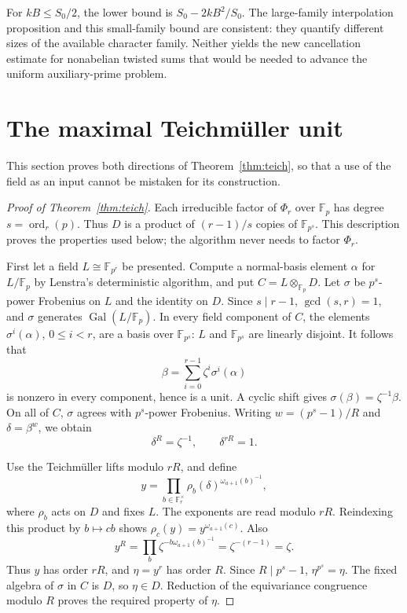 \documentclass[11pt]{article}
\newcommand{\F}{\mathbb F}
\newcommand{\ord}{\operatorname{ord}}
\newcommand{\Gal}{\operatorname{Gal}}
\theoremstyle{definition}
\theoremstyle{remark}
\begin{document}
For \(kB\leq S_0/2\), the lower bound is
\(S_0-2kB^2/S_0\). The large-family interpolation proposition
and this small-family bound are consistent: they quantify different
sizes of the available character family. Neither yields the new
cancellation estimate for nonabelian twisted sums that would be
needed to advance the uniform auxiliary-prime problem.


\section{The maximal Teichm\"uller unit}
This section proves both directions of Theorem~\ref{thm:teich},
so that a use of the field as an input cannot be mistaken for its construction.

\begin{proof}[Proof of Theorem~\ref{thm:teich}]
Each irreducible factor of $\Phi_r$ over $\F_p$ has degree
$s=\ord_r(p)$.  Thus $D$ is a product of $(r-1)/s$ copies
of $\F_{p^s}$.  This description proves the properties used
below; the algorithm never needs to factor $\Phi_r$.

First let a field $L\cong\F_{p^r}$ be presented.
Compute a normal-basis element $\alpha$ for $L/\F_p$ by
Lenstra's deterministic algorithm, and put $C=L\otimes_{\F_p}D$.
Let $\sigma$ be $p^s$-power Frobenius on $L$ and the identity
on $D$.  Since $s\mid r-1$, $\gcd(s,r)=1$, and $\sigma$
generates $\Gal(L/\F_p)$.  In every field component of $C$,
the elements $\sigma^i(\alpha)$, $0\le i<r$, are a basis over
$\F_{p^s}$: $L$ and $\F_{p^s}$ are linearly disjoint.
It follows that
\[
 \beta=\sum_{i=0}^{r-1}\zeta^i\sigma^i(\alpha)
\]
is nonzero in every component, hence is a unit.  A cyclic
shift gives $\sigma(\beta)=\zeta^{-1}\beta$.
On all of $C$, $\sigma$ agrees with $p^s$-power Frobenius.
Writing $w=(p^s-1)/R$ and $\delta=\beta^w$, we obtain
\[
 \delta^R=\zeta^{-1},\qquad \delta^{rR}=1.
\]

Use the Teichm\"uller lifts modulo $rR$, and define
\[
 y=\prod_{b\in\F_r^\times}
          \rho_b(\delta)^{\omega_{a+1}(b)^{-1}},
\]
where $\rho_b$ acts on $D$ and fixes $L$.
The exponents are read modulo $rR$.  Reindexing this product
by $b\mapsto cb$ shows $\rho_c(y)=y^{\omega_{a+1}(c)}$.
Also
\[
 y^R=\prod_b\zeta^{-b\omega_{a+1}(b)^{-1}}
     =\zeta^{-(r-1)}=\zeta.
\]
Thus $y$ has order $rR$, and $\eta=y^r$ has order $R$.
Since $R\mid p^s-1$, $\eta^{p^s}=\eta$.
The fixed algebra of $\sigma$ in $C$ is $D$, so $\eta\in D$.
Reduction of the equivariance congruence modulo $R$ proves
the required property of $\eta$.


\end{proof}
\end{document}
